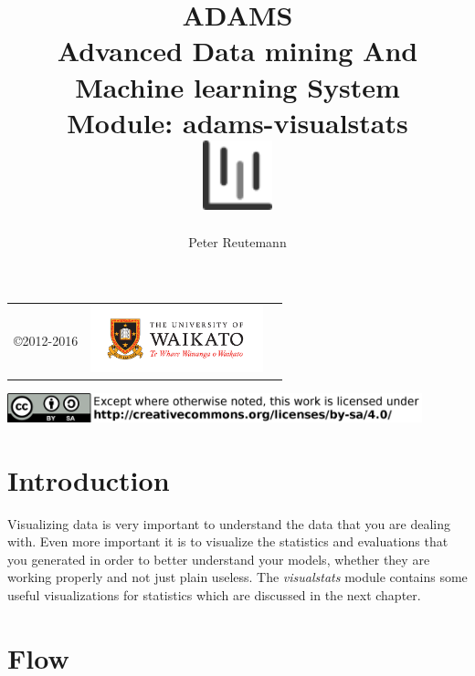 \documentclass[a4paper]{book}
\title{
  \textbf{ADAMS} \\
  {\Large \textbf{A}dvanced \textbf{D}ata mining \textbf{A}nd \textbf{M}achine
  learning \textbf{S}ystem} \\
  {\Large Module: adams-visualstats} \\
  \vspace{1cm}
  \includegraphics[width=2cm]{images/visualstats-module.png} \\
}
\author{
  Peter Reutemann
}
\begin{document}
\begin{titlepage}
\maketitle

\thispagestyle{empty}
\center
\begin{table}[b]
	\begin{tabular}{c l l}
		\parbox[c][2cm]{2cm}{\copyright 2012-2016} &
		\parbox[c][2cm]{5cm}{\includegraphics[width=5cm]{images/coat_of_arms.pdf}} \\
	\end{tabular}
	\includegraphics[width=12cm]{images/cc.png} \\
\end{table}

\end{titlepage}

\tableofcontents
\listoffigures

\chapter{Introduction}
Visualizing data is very important to understand the data that you are dealing
with. Even more important it is to visualize the statistics and evaluations 
that you generated in order to better understand your models, whether they are
working properly and not just plain useless. The \textit{visualstats} module
contains some useful visualizations for statistics which are discussed in the 
next chapter.

\chapter{Flow}
\end{document}
